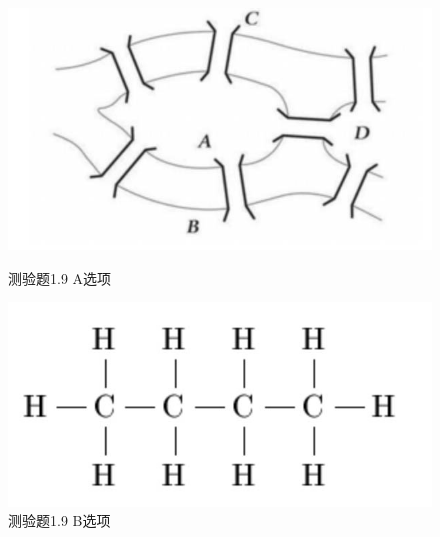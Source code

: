 \documentclass[UTF8, heading=true]{ctexart}
\begin{document}
\begin{figure}[H]
    \centering
    \begin{minipage}[t]{0.35\textwidth}
        \centering
        \includegraphics[width=1\textwidth]{1.9_1.jpg} %
        \caption{测验题1.9 A选项}
    \end{minipage}
    \hfill
    \begin{minipage}[t]{0.35\textwidth}
        \centering
        \includegraphics[width=1\textwidth]{1.9_2.jpg} %
        \caption{测验题1.9 B选项}
\end{minipage}
\end{figure}
\end{document}
